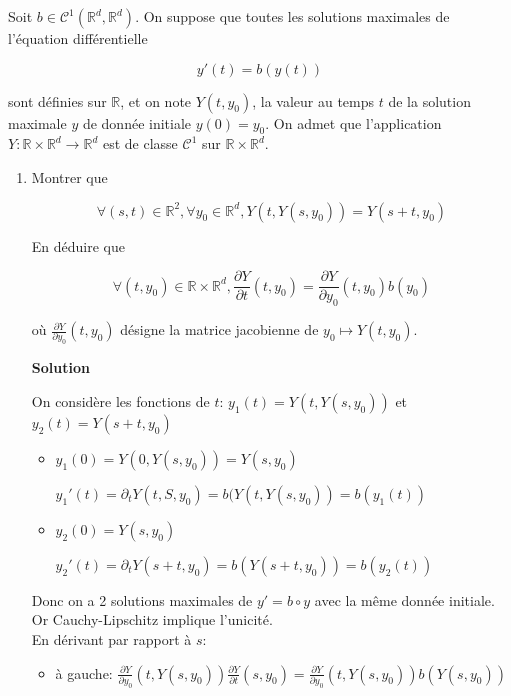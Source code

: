 \documentclass[10pt,a4paper,oneside]{article}
\newenvironment{exercice}[1][Exercice]{\begin{trivlist}
\item[\hskip \labelsep {\bfseries #1}]}{\end{trivlist}}
\begin{document}
\begin{exercice}{4}

Soit $b \in \mathcal{C}^1(\mathbb{R}^d,\mathbb{R}^d)$. On suppose que toutes les solutions maximales de l'équation différentielle

\[ y'(t) = b(y(t)) \]

sont définies sur $\mathbb{R}$, et on note $Y(t,y_0)$, la valeur au temps $t$ de la solution maximale $y$ de donnée initiale $y(0) = y_0$. On admet que l'application $Y: \mathbb{R} \times \mathbb{R}^d \to \mathbb{R}^d$ est de classe $\mathcal{C}^1$ sur $\mathbb{R} \times \mathbb{R}^d$.

\begin{enumerate}

\item
Montrer que

\[ \forall (s,t) \in \mathbb{R}^2, \forall y_0 \in \mathbb{R}^d, Y(t,Y(s,y_0)) = Y(s + t,y_0) \]

En déduire que

\[ \forall (t,y_0) \in \mathbb{R} \times \mathbb{R}^d, \frac{\partial Y}{\partial t}(t,y_0) = \frac{\partial Y}{\partial y_0}(t,y_0)b(y_0) \]

où $\frac{\partial Y}{\partial y_0}(t,y_0)$ désigne la matrice jacobienne de $y_0 \mapsto Y(t,y_0)$.

\textbf{Solution}

On considère les fonctions de $t$: $y_1(t) = Y(t,Y(s,y_0))$ et $y_2(t) = Y(s + t,y_0)$

\begin{itemize}
\item
$y_1(0) = Y(0,Y(s,y_0)) = Y(s,y_0)$

$y_1'(t) = \partial_t Y(t,S,y_0) = b(Y(t,Y(s,y_0)) = b(y_1(t))$

\item
$y_2(0) = Y(s,y_0)$

$y_2'(t) = \partial_t Y(s + t,y_0) = b(Y(s + t,y_0)) = b(y_2(t))$
\end{itemize}

Donc on a 2 solutions maximales de $y' = b \circ y$ avec la même donnée initiale. Or Cauchy-Lipschitz implique l'unicité.\\

En dérivant par rapport à $s$:

\begin{itemize}
\item
à gauche: $\frac{\partial Y}{\partial y_0}(t,Y(s,y_0)) \frac{\partial Y}{\partial t}(s,y_0) = \frac{\partial Y}{\partial y_0}(t,Y(s,y_0)) b(Y(s,y_0))$


\end{itemize}
\end{enumerate}
\end{exercice}
\end{document}

